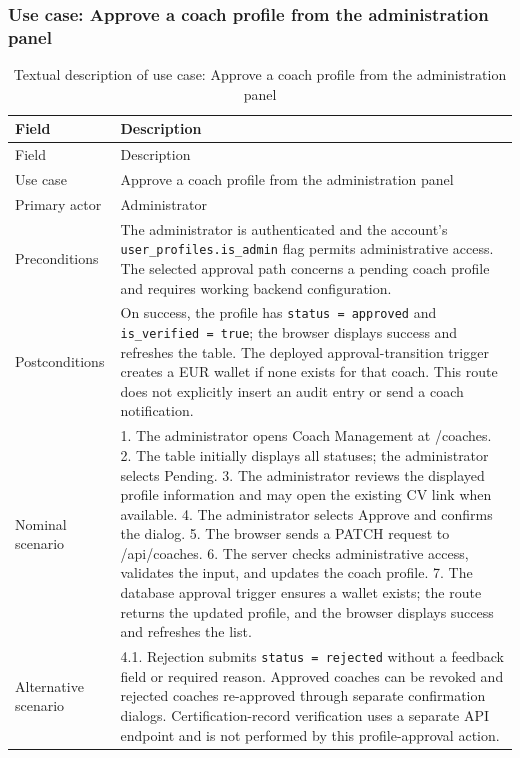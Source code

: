 \documentclass[12pt,a4paper,openany]{report}
\begin{document}
\subsubsection{Use case: Approve a coach profile from the administration panel}

\begingroup
\footnotesize
\setlength{\tabcolsep}{3pt}
\renewcommand{\arraystretch}{1.20}
\setlength{\LTpre}{5pt}
\setlength{\LTpost}{10pt}
\begin{longtable}{|L{4.95cm}|L{10.05cm}|}
\caption{Textual description of use case: Approve a coach profile from the administration panel}\label{tab:pdf-73-33} \\
\hline
{}
Field & Description \\ \hline
\endfirsthead
\hline
{}
Field & Description \\ \hline
\endhead
Use case & Approve a coach profile from the administration panel \\ \hline
Primary actor & Administrator \\ \hline
Preconditions & The administrator is authenticated and the account's \texttt{user\_profiles.is\_admin} flag permits administrative access. The selected approval path concerns a pending coach profile and requires working backend configuration. \\ \hline
Postconditions & On success, the profile has \texttt{status = approved} and \texttt{is\_verified = true}; the browser displays success and refreshes the table. The deployed approval-transition trigger creates a EUR wallet if none exists for that coach. This route does not explicitly insert an audit entry or send a coach notification. \\ \hline
Nominal scenario & 1. The administrator opens Coach Management at /coaches. 2. The table initially displays all statuses; the administrator selects Pending. 3. The administrator reviews the displayed profile information and may open the existing CV link when available. 4. The administrator selects Approve and confirms the dialog. 5. The browser sends a PATCH request to /api/coaches. 6. The server checks administrative access, validates the input, and updates the coach profile. 7. The database approval trigger ensures a wallet exists; the route returns the updated profile, and the browser displays success and refreshes the list. \\ \hline
Alternative scenario & 4.1. Rejection submits \texttt{status = rejected} without a feedback field or required reason. Approved coaches can be revoked and rejected coaches re-approved through separate confirmation dialogs. Certification-record verification uses a separate API endpoint and is not performed by this profile-approval action. \\ \hline

\end{longtable}
\end{document}
